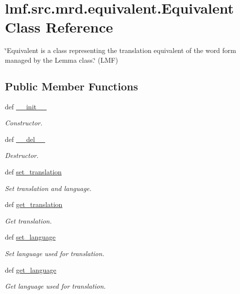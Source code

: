 \hypertarget{classlmf_1_1src_1_1mrd_1_1equivalent_1_1_equivalent}{\section{lmf.\+src.\+mrd.\+equivalent.\+Equivalent Class Reference}
\label{classlmf_1_1src_1_1mrd_1_1equivalent_1_1_equivalent}
}


\char`\"{}\+Equivalent is a class representing the translation equivalent of the word form managed by the Lemma class.\char`\"{} (L\+M\+F)  


\subsection*{Public Member Functions}
\begin{DoxyCompactItemize}
\item 
def \hyperlink{classlmf_1_1src_1_1mrd_1_1equivalent_1_1_equivalent_a155c0d440417e4b5edccbfb761da26b8}{\+\_\+\+\_\+init\+\_\+\+\_\+}
\begin{DoxyCompactList}\small\item\em Constructor. \end{DoxyCompactList}\item 
def \hyperlink{classlmf_1_1src_1_1mrd_1_1equivalent_1_1_equivalent_ab7030713535aaa3eefe76d833add3247}{\+\_\+\+\_\+del\+\_\+\+\_\+}
\begin{DoxyCompactList}\small\item\em Destructor. \end{DoxyCompactList}\item 
def \hyperlink{classlmf_1_1src_1_1mrd_1_1equivalent_1_1_equivalent_a8355ca8b0c55bb5838c0a3638850cdc8}{set\+\_\+translation}
\begin{DoxyCompactList}\small\item\em Set translation and language. \end{DoxyCompactList}\item 
def \hyperlink{classlmf_1_1src_1_1mrd_1_1equivalent_1_1_equivalent_ade1be4a6f62723df9ef3dae07097f616}{get\+\_\+translation}
\begin{DoxyCompactList}\small\item\em Get translation. \end{DoxyCompactList}\item 
def \hyperlink{classlmf_1_1src_1_1mrd_1_1equivalent_1_1_equivalent_a702a454d6017f332b18a589f25809106}{set\+\_\+language}
\begin{DoxyCompactList}\small\item\em Set language used for translation. \end{DoxyCompactList}\item 
def \hyperlink{classlmf_1_1src_1_1mrd_1_1equivalent_1_1_equivalent_a5766b0bb65eee515a95b7eb6987cf570}{get\+\_\+language}
\begin{DoxyCompactList}\small\item\em Get language used for translation. \end{DoxyCompactList}\end{DoxyCompactItemize}
